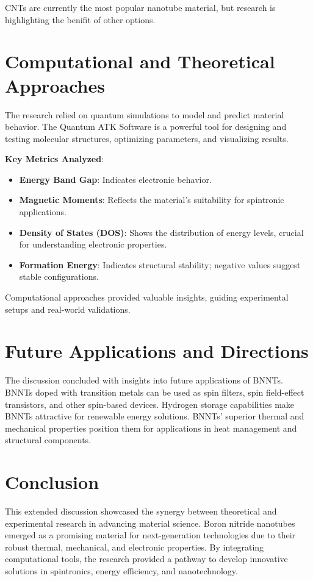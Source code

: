 \documentclass[12pt]{article}
\begin{document}
    CNTs are currently the most popular nanotube material, but research is highlighting the benifit of other options. 
    
\section{Computational and Theoretical Approaches}
    The research relied on quantum simulations to model and predict material behavior. The Quantum ATK Software is a powerful tool for designing and testing molecular structures, optimizing parameters, and visualizing results.
    
    \textbf{Key Metrics Analyzed}:
    \begin{itemize}
        \item \textbf{Energy Band Gap}: Indicates electronic behavior.
        \item \textbf{Magnetic Moments}: Reflects the material's suitability for spintronic applications.
        \item \textbf{Density of States (DOS)}: Shows the distribution of energy levels, crucial for understanding electronic properties.
        \item \textbf{Formation Energy}: Indicates structural stability; negative values suggest stable configurations.
    \end{itemize}

    Computational approaches provided valuable insights, guiding experimental setups and real-world validations.

\section{Future Applications and Directions}
    The discussion concluded with insights into future applications of BNNTs. BNNTs doped with transition metals can be used as spin filters, spin field-effect transistors, and other spin-based devices. Hydrogen storage capabilities make BNNTs attractive for renewable energy solutions. BNNTs' superior thermal and mechanical properties position them for applications in heat management and structural components.

\section{Conclusion}
This extended discussion showcased the synergy between theoretical and experimental research in advancing material science. Boron nitride nanotubes emerged as a promising material for next-generation technologies due to their robust thermal, mechanical, and electronic properties. By integrating computational tools, the research provided a pathway to develop innovative solutions in spintronics, energy efficiency, and nanotechnology.

\end{document}
